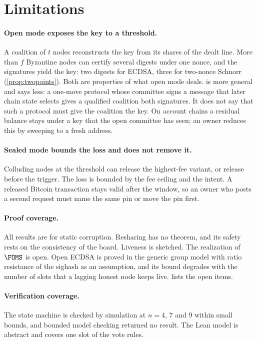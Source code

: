 \section{Limitations}\label{sec:limits}

\paragraph{Open mode exposes the key to a threshold.} A coalition of $t$ nodes reconstructs the key from its shares of the dealt line. More than $f$ Byzantine nodes can certify several digests under one nonce, and the signatures yield the key: two digests for ECDSA, three for two-nonce Schnorr (\cref{prop:twopoints}). Both are properties of what open mode deals.  is more general and says less: a one-move protocol whose committee signs a message that later chain state selects gives a qualified coalition both signatures. It does not say that such a protocol must give the coalition the key. On account chains a residual balance stays under a key that the open committee has seen; an owner reduces this by sweeping to a fresh address.

\paragraph{Sealed mode bounds the loss and does not remove it.} Colluding nodes at the threshold can release the highest-fee variant, or release before the trigger. The loss is bounded by the fee ceiling and the intent. A released Bitcoin transaction stays valid after the window, so an owner who posts a second request must name the same pin or move the pin first.

\paragraph{Proof coverage.} All results are for static corruption. Resharing has no theorem, and its safety rests on the consistency of the board. Liveness is sketched. The realization of $\FOMS$ is open. Open ECDSA is proved in the generic group model with ratio resistance of the sighash as an assumption, and its bound degrades with the number of slots that a lagging honest node keeps live.  lists the open items.

\paragraph{Verification coverage.} The state machine is checked by simulation at $n = 4$, $7$ and $9$ within small bounds, and bounded model checking returned no result. The Lean model is abstract and covers one slot of the vote rules.

